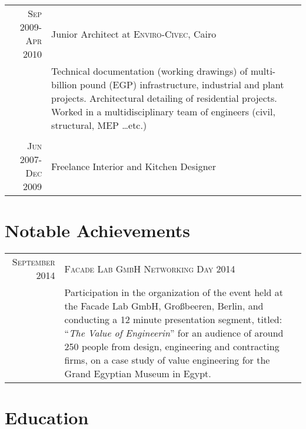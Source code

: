 \documentclass[a4paper,11pt]{article} %
\begin{document}
\begin{tabular}{r|p{11cm}}

\textsc{Sep 2009-Apr 2010} & Junior Architect at \textsc{Enviro-Civec}, Cairo \emph{}\\
& \footnotesize{Technical documentation (working drawings) of multi-billion pound (EGP) infrastructure, industrial and plant projects. Architectural detailing of residential projects. Worked in a multidisciplinary team of engineers (civil, structural, MEP \ldots{}etc.)}\\
\multicolumn{2}{c}{} \\



\textsc{Jun 2007-Dec 2009} & Freelance Interior and Kitchen Designer\\
\end{tabular}

\vspace{0.5cm}

\section{Notable Achievements}

\begin{tabular}{r|p{11cm}}
\textsc{September 2014} & \textsc{Facade Lab GmbH Networking Day 2014}\\ 
& \footnotesize{Participation in the organization of the event held at the Facade Lab GmbH, Gro\ss beeren, Berlin, and conducting a 12 minute presentation segment, titled: ``\emph{The Value of Engineerin}'' for an audience of around 250 people from design, engineering and contracting firms, on a case study of value engineering for the Grand Egyptian Museum in Egypt.}\\
\end{tabular}


\section{Education}
\end{document}
